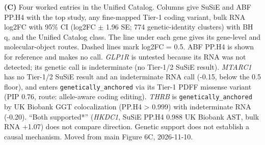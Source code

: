 \textbf{(C)} Four worked entries in the Unified Catalog. Columns give SuSiE and ABF PP.H4 with the top study, any fine-mapped Tier-1 coding variant, bulk RNA log2FC with 95\% CI (log2FC $\pm$ 1.96 SE; 774 genetic-identity clusters) with BH q, and the Unified Catalog class. The line under each gene gives its gene-level and molecular-object routes. Dashed lines mark \textbar log2FC\textbar{} = 0.5. ABF PP.H4 is shown for reference and makes no call. \emph{GLP1R} is untested because its RNA was not detected; its genetic call is indeterminate (no Tier-1/2 SuSiE result). \emph{MTARC1} has no Tier-1/2 SuSiE result and an indeterminate RNA call (-0.15, below the 0.5 floor), and enters \texttt{genetically\_anchored} via its Tier-1 PDFF missense variant (PIP 0.76, route: allele-aware coding editing). \emph{THRB} is \texttt{genetically\_anchored} by UK Biobank GGT colocalization (PP.H4 \textgreater{} 0.999) with indeterminate RNA (-0.20). ``Both supported*'' (\emph{HKDC1}, SuSiE PP.H4 0.988 UK Biobank AST, bulk RNA +1.07) does not compare direction. Genetic support does not establish a causal mechanism. Moved from main Figure 6C, 2026-11-10.
